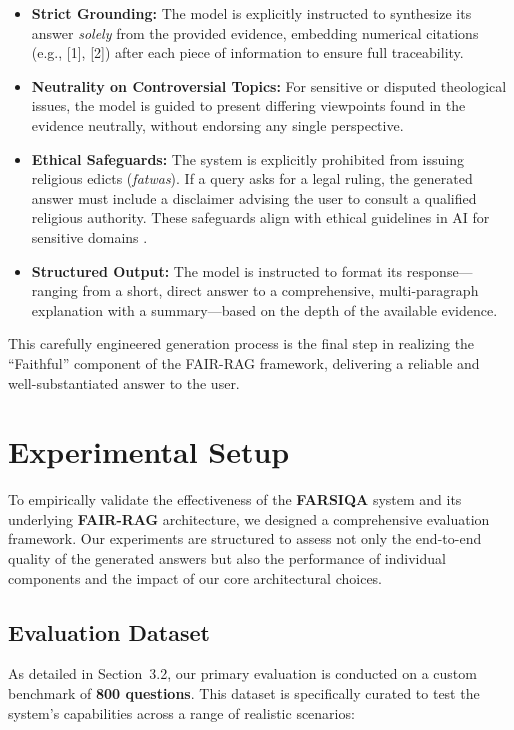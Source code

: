 \documentclass[11pt]{article}
\begin{document}
\begin{itemize}
    \item \textbf{Strict Grounding:} The model is explicitly instructed to synthesize its answer \emph{solely} from the provided evidence, embedding numerical citations (e.g., [1], [2]) after each piece of information to ensure full traceability.
    \item \textbf{Neutrality on Controversial Topics:} For sensitive or disputed theological issues, the model is guided to present differing viewpoints found in the evidence neutrally, without endorsing any single perspective.
    \item \textbf{Ethical Safeguards:} The system is explicitly prohibited from issuing religious edicts (\emph{fatwas}). If a query asks for a legal ruling, the generated answer must include a disclaimer advising the user to consult a qualified religious authority. These safeguards align with ethical guidelines in AI for sensitive domains \cite{weidinger2021ethical}.
    \item \textbf{Structured Output:} The model is instructed to format its response---ranging from a short, direct answer to a comprehensive, multi-paragraph explanation with a summary---based on the depth of the available evidence.
\end{itemize}

This carefully engineered generation process is the final step in realizing the ``Faithful'' component of the FAIR-RAG framework, delivering a reliable and well-substantiated answer to the user. \cite{fairrag}

\section{Experimental Setup}

To empirically validate the effectiveness of the \textbf{FARSIQA} system and its underlying \textbf{FAIR-RAG} architecture, we designed a comprehensive evaluation framework. Our experiments are structured to assess not only the end-to-end quality of the generated answers but also the performance of individual components and the impact of our core architectural choices.

\subsection{Evaluation Dataset}

As detailed in Section~3.2, our primary evaluation is conducted on a custom benchmark of \textbf{800 questions}. This dataset is specifically curated to test the system's capabilities across a range of realistic scenarios:
\end{document}
